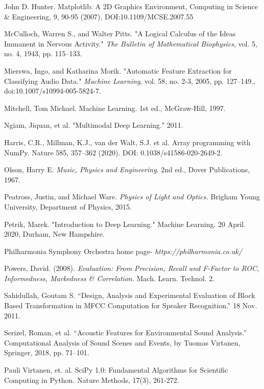 \documentclass[12pt,letterpaper]{article}
\begin{document}
\begin{thebibliography}{9}
John D. Hunter. Matplotlib: A 2D Graphics Environment, Computing in Science \& Engineering, 9, 90-95 (2007), DOI:10.1109/MCSE.2007.55

McCulloch, Warren S., and Walter Pitts. "A Logical Calculus of the Ideas Immanent in Nervous Activity." \textit{The Bulletin of Mathematical Biophysics}, vol. 5, no. 4, 1943, pp. 115–133.

Mierswa, Ingo, and Katharina Morik. "Automatic Feature Extraction for Classifying Audio Data." \textit{Machine Learning}, vol. 58, no. 2-3, 2005, pp. 127–149., doi:10.1007/s10994-005-5824-7.

Mitchell, Tom Michael. Machine Learning. 1st ed., McGraw-Hill, 1997.

Ngiam, Jiquan, et al. "Multimodal Deep Learning." 2011. 

Harris, C.R., Millman, K.J., van der Walt, S.J. et al. Array programming with NumPy. Nature 585, 357–362 (2020). DOI: 0.1038/s41586-020-2649-2. 

Olson, Harry E. \textit{Music, Physics and Engineering}. 2nd ed., Dover Publications, 1967.

Peatross, Justin, and Michael Ware. \textit{Physics of Light and Optics.} Brigham Young University, Department of Physics, 2015.

Petrik, Marek. "Introduction to Deep Learning." Machine Learning. 20 April. 2020, Durham, New Hampshire.

Philharmonia Symphony Orchestra home page- \textit{https://philharmonia.co.uk/}

Powers, David. (2008). \textit{Evaluation: From Precision, Recall and F-Factor to ROC, Informedness, Markedness \& Correlation}. Mach. Learn. Technol. 2. 

Sahidullah, Goutam S. “Design, Analysis and Experimental Evaluation of Block Based Transformation in MFCC Computation for Speaker Recognition.” 18 Nov. 2011. 

Serizel, Roman, et al. “Acoustic Features for Environmental Sound Analysis.” Computational Analysis of Sound Scenes and Events, by Tuomas Virtanen, Springer, 2018, pp. 71–101. 

Pauli Virtanen, et. al. SciPy 1.0: Fundamental Algorithms for Scientific Computing in Python. Nature Methods, 17(3), 261-272.


\end{thebibliography}
\end{document}
